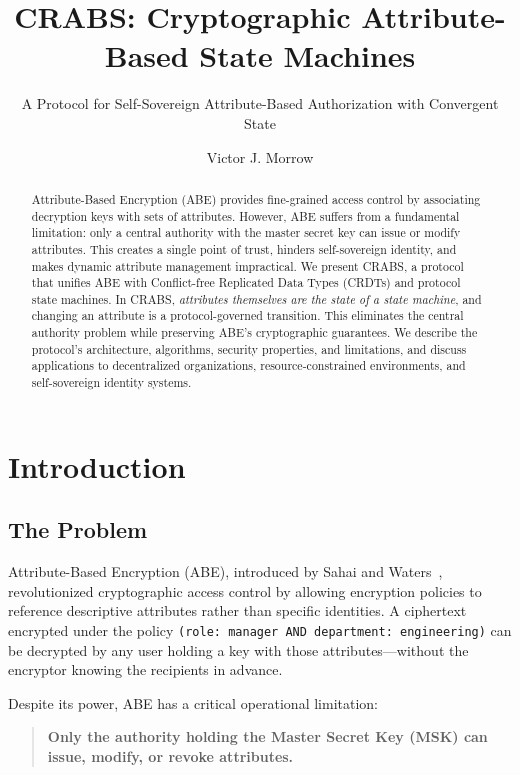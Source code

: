 \documentclass[sigconf,nonacm]{acmart}
\title{CRABS: Cryptographic Attribute-Based State Machines}
\subtitle{A Protocol for Self-Sovereign Attribute-Based Authorization with Convergent State}
\author{Victor J. Morrow}
\affiliation{%
  \institution{Prometheus}
}
\newcommand{\crab}{\textsc{CRABS}}
\begin{document}
\begin{abstract}
Attribute-Based Encryption (ABE) provides fine-grained access control by associating decryption keys with sets of attributes. However, ABE suffers from a fundamental limitation: only a central authority with the master secret key can issue or modify attributes. This creates a single point of trust, hinders self-sovereign identity, and makes dynamic attribute management impractical. We present \crab{}, a protocol that unifies ABE with Conflict-free Replicated Data Types (CRDTs) and protocol state machines. In \crab{}, \textit{attributes themselves are the state of a state machine}, and changing an attribute is a protocol-governed transition. This eliminates the central authority problem while preserving ABE's cryptographic guarantees. We describe the protocol's architecture, algorithms, security properties, and limitations, and discuss applications to decentralized organizations, resource-constrained environments, and self-sovereign identity systems.
\end{abstract}

\maketitle

\section{Introduction}

\subsection{The Problem}

Attribute-Based Encryption (ABE), introduced by Sahai and Waters~\cite{sahai2005fuzzy}, revolutionized cryptographic access control by allowing encryption policies to reference descriptive attributes rather than specific identities. A ciphertext encrypted under the policy \texttt{(role: manager AND department: engineering)} can be decrypted by any user holding a key with those attributes---without the encryptor knowing the recipients in advance.

Despite its power, ABE has a critical operational limitation:

\begin{quote}
\textbf{Only the authority holding the Master Secret Key (MSK) can issue, modify, or revoke attributes.}
\end{quote}
\end{document}
